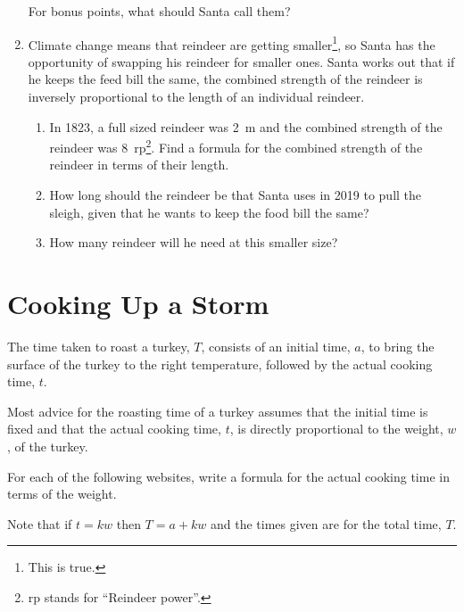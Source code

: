 \documentclass{article}
\begin{document}
\begin{enumerate}
For bonus points, what should Santa call them?

\item Climate change means that reindeer are getting smaller\footnote{This is true.}, so Santa has the opportunity of swapping his reindeer for smaller ones.
Santa works out that if he keeps the feed bill the same, the combined strength of the reindeer is inversely proportional to the length of an individual reindeer.

\begin{enumerate}

\item In 1823, a full sized reindeer was \SI{2}{m} and the combined strength of the reindeer was \SI{8}{rp}\footnote{\si{rp} stands for ``Reindeer power''.}.
Find a formula for the combined strength of the reindeer in terms of their length.

\item How long should the reindeer be that Santa uses in 2019 to pull the sleigh, given that he wants to keep the food bill the same?

\item How many reindeer will he need at this smaller size?
\end{enumerate}
\end{enumerate}

\newpage
\section{Cooking Up a Storm}

The time taken to roast a turkey, \(T\), consists of an initial time, \(a\), to bring the surface of the turkey to the right temperature, followed by the actual cooking time, \(t\).

Most advice for the roasting time of a turkey assumes that the initial time is fixed and that the actual cooking time, \(t\), is directly proportional to the weight, \(w\), of the turkey.

For each of the following websites, write a formula for the actual cooking time in terms of the weight.

Note that if \(t = k w\) then \(T = a + k w\) and the times given are for the total time, \(T\).
\end{document}

